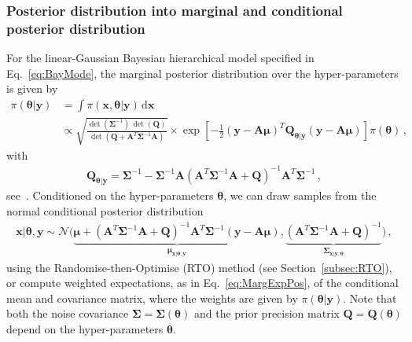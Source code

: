 \subsubsection{Posterior distribution into marginal and conditional posterior distribution}

\label{subsec:MTC}
For the linear-Gaussian Bayesian hierarchical model specified in Eq.~\ref{eq:BayMode}, the marginal posterior distribution over the hyper-parameters is given by
\begin{align}
	\pi(\bm{\theta} |  \bm{y}) &= \int \pi(\bm{x}, \bm{\theta} | \bm{y}) \, \mathrm{d} \bm{x} \\ 
	\label{eq:condHyper}
	&\propto \sqrt{ \frac{ \det( \bm{\Sigma}^{-1} ) \,  \det( \bm{Q} ) }{\det( \bm{Q} + \bm{A}^T \bm{\Sigma}^{-1} \bm{A} ) } } \times \exp \left[ - \frac{1}{2}(\bm{y} - \bm{A} \bm{\mu})^T \bm{Q}_{\bm{\theta |  y}} (\bm{y} - \bm{A} \bm{\mu}) \right] \pi(\bm{\theta}) \, ,
\end{align}
with
\begin{align}
	\bm{Q}_{\bm{\theta |  y}} = \bm{\Sigma}^{-1} - \bm{\Sigma}^{-1} \bm{A} \left( \bm{A}^T \bm{\Sigma}^{-1} \bm{A} + \bm{Q} \right)^{-1} \bm{A}^T \bm{\Sigma}^{-1} \, ,
\end{align}
see~\cite[Lemma 2]{fox2016fast}. 
Conditioned on the hyper-parameters $\bm{\theta}$, we can draw samples from the normal conditional posterior distribution
\begin{align}
	\bm{x} |  \bm{\theta}, \bm{y} \sim \mathcal{N} \Big(
	\underbrace{\bm{\mu} + \left( \bm{A}^T \bm{\Sigma}^{-1} \bm{A} + \bm{Q} \right)^{-1} \bm{A}^T \bm{\Sigma}^{-1} (\bm{y} - \bm{A} \bm{\mu})}_{\bm{\mu}_{\bm{x} |  \bm{\theta}, \bm{y}}},
	\underbrace{ \left( \bm{A}^T \bm{\Sigma}^{-1} \bm{A} + \bm{Q} \right)^{-1} }_{\bm{\Sigma}_{\bm{x} |  \bm{y}, \bm{\theta}}}
	\Big) \, ,
\end{align}
using the Randomise-then-Optimise (RTO) method (see Section~\ref{subsec:RTO}), or compute weighted expectations, as in Eq.~\ref{eq:MargExpPos}, of the conditional mean and covariance matrix, where the weights are given by $\pi(\bm{\theta} | \bm{y})$. 
Note that both the noise covariance $\bm{\Sigma} = \bm{\Sigma}(\bm{\theta})$ and the prior precision matrix $\bm{Q} = \bm{Q}(\bm{\theta})$ depend on the hyper-parameters $\bm{\theta}$.

